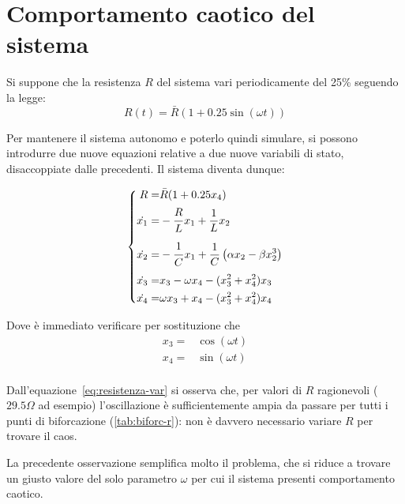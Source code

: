 \section{Comportamento caotico del sistema}

Si suppone che la resistenza $R$ del sistema vari periodicamente del 25\% seguendo la legge:
\begin{equation}
    R(t) = \bar{R} (1+0.25 \sin(\omega t))
    \label{eq:resistenza-var}
\end{equation}

Per mantenere il sistema autonomo e poterlo quindi simulare, si possono introdurre due nuove equazioni relative a due nuove variabili di stato, disaccoppiate dalle precedenti.
Il sistema diventa dunque:

\begin{equation}
    \left\{
    \begin{aligned}
        R =& \bar{R} (1+0.25 x_4) \\
        \dot{x_1} =& -\frac{\strut R}{\strut L}x_1 + \frac{1}{L} x_2\\
        \dot{x_2} =& -\frac{\strut 1}{\strut C} x_1 + \frac{1}{C}\left( \alpha x_2 - \beta x_2^3\right)\\
        \dot{x_3} =& x_3 - \omega x_4 - (x_3^2+x_4^2) x_3 \\
        \dot{x_4} =& \omega x_3 + x_4 - (x_3^2+x_4^2) x_4 \\
    \end{aligned}
    \right.
    \label{eq:sistema-chaos}
\end{equation}

Dove è immediato verificare per sostituzione che
\begin{equation}
    \begin{aligned}
        x_3 =& \cos (\omega t)\\
        x_4 =& \sin (\omega t)\\
    \end{aligned}
\end{equation}

Dall'equazione~\ref{eq:resistenza-var} si osserva che, per valori di $R$ ragionevoli ($29.5 \Omega$ ad esempio) l'oscillazione è sufficientemente ampia da passare per tutti i punti di biforcazione (\autoref{tab:biforc-r}): non è davvero necessario variare $R$ per trovare il caos.

La precedente osservazione semplifica molto il problema, che si riduce a trovare un giusto valore del solo parametro $\omega$ per cui il sistema presenti comportamento caotico.

